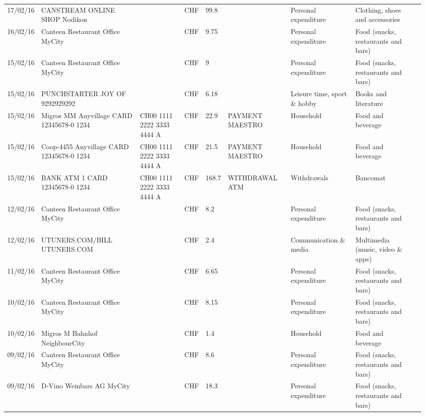 \begin{landscape}
\begin{tiny}
\begin{longtable}{lp{4cm}llllp{3cm}ll}
		    17/02/16 & CANSTREAM ONLINE SHOP    Nodikon &       & CHF   & 99.8  &       & Personal expenditure & Clothing, shoes and accessories \\
		    16/02/16 & Canteen Restaurant Office      MyCity &       & CHF   & 9.75  &       & Personal expenditure & Food (snacks, restaurants and bars) \\
		    15/02/16 & Canteen Restaurant Office      MyCity &       & CHF   & 9     &       & Personal expenditure & Food (snacks, restaurants and bars) \\
		    15/02/16 & PUNCHSTARTER JOY OF   9292929292 &       & CHF   & 6.18  &       & Leisure time, sport \& hobby & Books and literature \\
		    15/02/16 & Migros MM Anyvillage CARD 12345678-0 1234 & CH00 1111 2222 3333 4444 A & CHF   & 22.9  & PAYMENT MAESTRO & Household & Food and beverage \\
		    15/02/16 & Coop-4455 Anyvillage CARD 12345678-0 1234 & CH00 1111 2222 3333 4444 A & CHF   & 21.5  & PAYMENT MAESTRO & Household & Food and beverage \\
		    15/02/16 & BANK ATM 1 CARD 12345678-0 1234 & CH00 1111 2222 3333 4444 A & CHF   & 168.7 & WITHDRAWAL ATM & Withdrawals & Bancomat \\
		    12/02/16 & Canteen Restaurant Office      MyCity &       & CHF   & 8.2   &       & Personal expenditure & Food (snacks, restaurants and bars) \\
		    12/02/16 & UTUNERS.COM/BILL          UTUNERS.COM &       & CHF   & 2.4   &       & Communication \& media & Multimedia (music, video \& apps) \\
		    11/02/16 & Canteen Restaurant Office      MyCity &       & CHF   & 6.65  &       & Personal expenditure & Food (snacks, restaurants and bars) \\
		    10/02/16 & Canteen Restaurant Office      MyCity &       & CHF   & 8.15  &       & Personal expenditure & Food (snacks, restaurants and bars) \\
		    10/02/16 & Migros M Bahnhof         NeighbourCity &       & CHF   & 1.4   &       & Household & Food and beverage \\
		    09/02/16 & Canteen Restaurant Office      MyCity &       & CHF   & 8.6   &       & Personal expenditure & Food (snacks, restaurants and bars) \\
		    09/02/16 & D-Vino Weinbars AG       MyCity &       & CHF   & 18.3  &       & Personal expenditure & Food (snacks, restaurants and bars) \\

\end{longtable}
\end{tiny}
\end{landscape}
